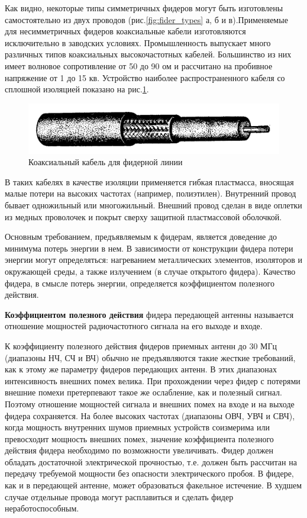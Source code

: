 Как видно, некоторые типы симметричных фидеров могут быть изготовлены самостоятельно из двух проводов (рис.\ref{fig:fider_types} а, б и в).Применяемые для несимметричных фидеров коаксиальные кабели изготовляются исключительно в заводских условиях. Промышленность выпускает много различных типов коаксиальных высокочастотных кабелей. Большинство из них имеет волновое сопротивление от 50 до 90 ом и рассчитано на пробивное напряжение от 1 до 15 кв. Устройство наиболее распространенного кабеля со сплошной изоляцией показано на рис.\ref{fig:koax}. 

\begin{figure}[H]
    \centering
    \includegraphics[width=.9\textwidth]{img/koax.png}
    \caption{Коаксиальный кабель для фидерной линии}
    \label{fig:koax}
\end{figure}

В таких кабелях в качестве изоляции применяется гибкая пластмасса, вносящая малые потери на высоких частотах (например, полиэтилен). Внутренний провод бывает одножильный или многожильный. Внешний провод сделан в виде оплетки из медных проволочек и покрыт сверху защитной пластмассовой оболочкой.

Основным требованием, предъявляемым к фидерам, является доведение до минимума потерь энергии в нем. В зависимости от конструкции фидера потери энергии могут определяться: нагреванием металлических элементов, изоляторов и окружающей среды, а также излучением (в случае открытого фидера). Качество фидера, в смысле потерь энергии, определяется коэффициентом полезного действия. 

\textbf{Коэффициентом полезного действия} фидера передающей антенны называется отношение мощностей радиочастотного сигнала на его выходе и входе.



К коэффициенту полезного действия фидеров приемных антенн до 30 МГц (диапазоны НЧ, СЧ и ВЧ) обычно не предъявляются такие жесткие требований, как к этому же параметру фидеров передающих антенн. В этих диапазонах интенсивность внешних помех велика. При прохождении через фидер с потерями внешние помехи претерпевают такое же ослабление, как и полезный сигнал. Поэтому отношение мощностей сигнала и внешних помех на входе и на выходе фидера сохраняется. На более высоких частотах (диапазоны ОВЧ, УВЧ и СВЧ), когда мощность внутренних шумов приемных устройств соизмерима или превосходит мощность внешних помех, значение коэффициента полезного действия фидера необходимо по возможности увеличивать. Фидер должен обладать достаточной электрической прочностью, т.е. должен быть рассчитан на передачу требуемой мощности без опасности электрического пробоя. В фидере, как и в передающей антенне, может образоваться факельное истечение. В худшем случае отдельные провода могут расплавиться и сделать фидер неработоспособным.



